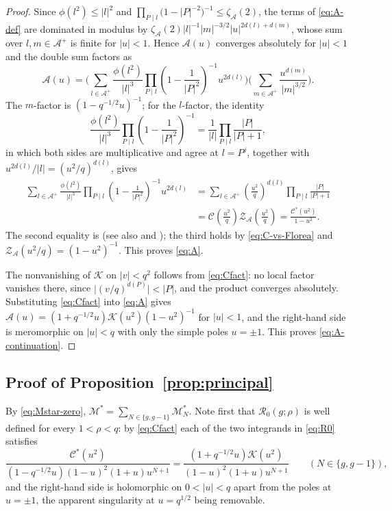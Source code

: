 \documentclass[a4paper,reqno]{amsart}
\numberwithin{equation}{section}
\theoremstyle{remark}
\theoremstyle{definition}
\newcommand{\A}{\mathcal{A}}
\newcommand{\zA}{\zeta_{\A}}
\begin{document}
\begin{proof}
Since $\phi(l^2)\le|l|^2$ and
$\prod_{P\mid l}\bigl(1-|P|^{-2}\bigr)^{-1}\le\zA(2)$, the terms of
\eqref{eq:A-def} are dominated in modulus by
$\zA(2)|l|^{-1}|m|^{-3/2}|u|^{2d(l)+d(m)}$, whose sum over $l,m\in\A^+$ is
finite for $|u|<1$. Hence $\mathcal A(u)$ converges absolutely for $|u|<1$
and the double sum factors as
$$
\mathcal A(u)
=\Biggl(\sum_{l\in\A^+}\frac{\phi(l^2)}{|l|^3}
\prod_{P\mid l}\left(1-\frac{1}{|P|^2}\right)^{-1}u^{2d(l)}\Biggr)
\Biggl(\sum_{m\in\A^+}\frac{u^{d(m)}}{|m|^{3/2}}\Biggr).
$$
The $m$-factor is $(1-q^{-1/2}u)^{-1}$; for the $l$-factor, the identity
$$
\frac{\phi(l^2)}{|l|^3}\prod_{P\mid l}\left(1-\frac{1}{|P|^2}\right)^{-1}
=\frac{1}{|l|}\prod_{P\mid l}\frac{|P|}{|P|+1},
$$
in which both sides are multiplicative and agree at $l=P^j$, together with
$u^{2d(l)}/|l|=(u^2/q)^{d(l)}$, gives
\begin{align*}
\sum_{l\in\A^+}\frac{\phi(l^2)}{|l|^3}
\prod_{P\mid l}\left(1-\frac{1}{|P|^2}\right)^{-1}u^{2d(l)}
&=\sum_{l\in\A^+}\left(\frac{u^2}{q}\right)^{d(l)}
\prod_{P\mid l}\frac{|P|}{|P|+1}\\
&=\mathcal C\!\left(\frac{u^2}{q}\right)
 \mathcal Z_{\A}\!\left(\frac{u^2}{q}\right)
=\frac{\mathcal C^*(u^2)}{1-u^2}.
\end{align*}
The second equality is \cite[Section~5]{Fl17-1} (see also
\cite[(3.15)]{Ju20} and \cite[(4.10)]{AM-21}); the third holds by
\eqref{eq:C-vs-Florea} and $\mathcal Z_{\A}(u^2/q)=(1-u^2)^{-1}$. This
proves \eqref{eq:A}.

The nonvanishing of $\mathcal K$ on $|v|<q^2$ follows from
\eqref{eq:Cfact}: no local factor vanishes there, since
$\bigl|(v/q)^{d(P)}\bigr|<|P|$, and the product converges absolutely.
Substituting \eqref{eq:Cfact} into \eqref{eq:A} gives
$\mathcal A(u)=(1+q^{-1/2}u)\mathcal K(u^2)(1-u^2)^{-1}$ for $|u|<1$, and
the right-hand side is meromorphic on $|u|<q$ with only the simple poles
$u=\pm1$. This proves \eqref{eq:A-continuation}.
\end{proof}

\subsection{Proof of Proposition~\ref{prop:principal}}

By \eqref{eq:Mstar-zero}, $\mathcal M^*=\sum_{N\in\{g,g-1\}}\mathcal M_N^*$.
Note first that $\mathcal R_0(g;\rho)$ is well defined for every $1<\rho<q$:
by \eqref{eq:Cfact} each of the two integrands in \eqref{eq:R0}
satisfies
\begin{equation}\label{eq:R0-integrand}
\frac{\mathcal C^*(u^2)}{(1-q^{-1/2}u)(1-u)^2(1+u)u^{N+1}}
=\frac{(1+q^{-1/2}u)\mathcal K(u^2)}{(1-u)^2(1+u)u^{N+1}}
\qquad(N\in\{g,g-1\}),
\end{equation}
and the right-hand side is holomorphic on $0<|u|<q$ apart from the poles at
$u=\pm1$, the apparent singularity at $u=q^{1/2}$ being removable.
\end{document}

